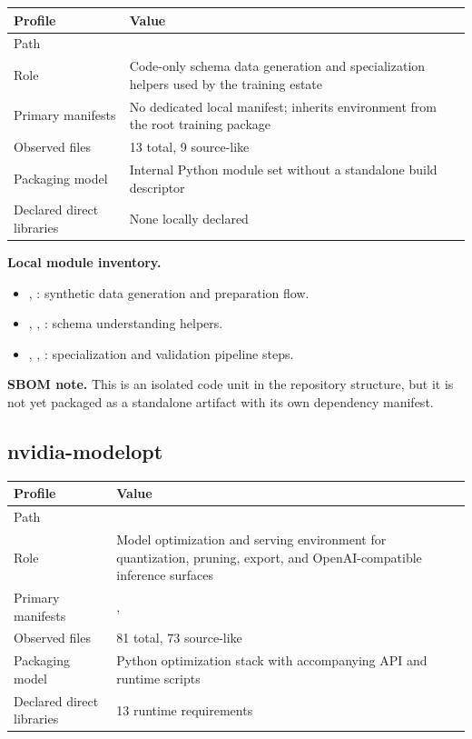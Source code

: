 \documentclass[11pt,a4paper]{article}
\begin{document}
\begin{tabular}{@{}P{4.2cm}P{9.8cm}@{}}
\toprule
\textbf{Profile} & \textbf{Value} \\
\midrule
Path &  \\
Role & Code-only schema data generation and specialization helpers used by the training estate \\
Primary manifests & No dedicated local manifest; inherits environment from the root training package \\
Observed files & 13 total, 9 source-like \\
Packaging model & Internal Python module set without a standalone build descriptor \\
Declared direct libraries & None locally declared \\
\bottomrule
\end{tabular}

\textbf{Local module inventory.}
\begin{itemize}[leftmargin=*]
    \item {}, : synthetic data generation and preparation flow.
    \item {}, , : schema understanding helpers.
    \item {}, , : specialization and validation pipeline steps.
\end{itemize}

\textbf{SBOM note.} This is an isolated code unit in the repository structure, but it is not yet packaged as a standalone artifact with its own dependency manifest.

\subsection{nvidia-modelopt}

\begin{tabular}{@{}P{4.2cm}P{9.8cm}@{}}
\toprule
\textbf{Profile} & \textbf{Value} \\
\midrule
Path &  \\
Role & Model optimization and serving environment for quantization, pruning, export, and OpenAI-compatible inference surfaces \\
Primary manifests & ,  \\
Observed files & 81 total, 73 source-like \\
Packaging model & Python optimization stack with accompanying API and runtime scripts \\
Declared direct libraries & 13 runtime requirements \\
\bottomrule
\end{tabular}
\end{document}
